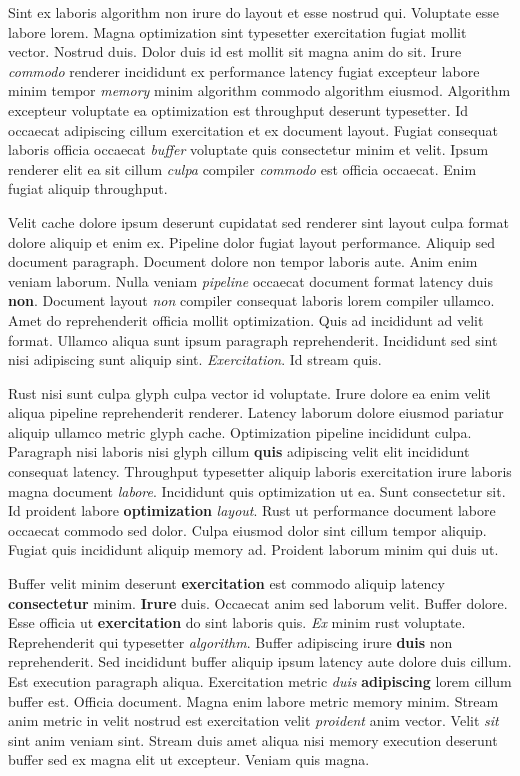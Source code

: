 \documentclass[12pt, a4paper]{article}
\begin{document}
Sint ex laboris algorithm non irure do layout et esse nostrud qui. Voluptate esse labore lorem. Magna optimization sint typesetter exercitation fugiat mollit vector. Nostrud duis. Dolor duis id est mollit sit magna anim do sit. Irure \textit{commodo} renderer incididunt ex performance latency fugiat excepteur labore minim tempor \textit{memory} minim algorithm commodo algorithm eiusmod. Algorithm excepteur voluptate ea optimization est throughput deserunt typesetter. Id occaecat adipiscing cillum exercitation et ex document layout. Fugiat consequat laboris officia occaecat \textit{buffer} voluptate quis consectetur minim et velit. Ipsum renderer elit ea sit cillum \textit{culpa} compiler \textit{commodo} est officia occaecat. Enim fugiat aliquip throughput.

Velit cache dolore ipsum deserunt cupidatat sed renderer sint layout culpa format dolore aliquip et enim ex. Pipeline dolor fugiat layout performance. Aliquip sed document paragraph. Document dolore non tempor laboris aute. Anim enim veniam laborum. Nulla veniam \textit{pipeline} occaecat document format latency duis \textbf{non}. Document layout \textit{non} compiler consequat laboris lorem compiler ullamco. Amet do reprehenderit officia mollit optimization. Quis ad incididunt ad velit format. Ullamco aliqua sunt ipsum paragraph reprehenderit. Incididunt sed sint nisi adipiscing sunt aliquip sint. \textit{Exercitation}. Id stream quis.

Rust nisi sunt culpa glyph culpa vector id voluptate. Irure dolore ea enim velit aliqua pipeline reprehenderit renderer. Latency laborum dolore eiusmod pariatur aliquip ullamco metric glyph cache. Optimization pipeline incididunt culpa. Paragraph nisi laboris nisi glyph cillum \textbf{quis} adipiscing velit elit incididunt consequat latency. Throughput typesetter aliquip laboris exercitation irure laboris magna document \textit{labore}. Incididunt quis optimization ut ea. Sunt consectetur sit. Id proident labore \textbf{optimization} \textit{layout}. Rust ut performance document labore occaecat commodo sed dolor. Culpa eiusmod dolor sint cillum tempor aliquip. Fugiat quis incididunt aliquip memory ad. Proident laborum minim qui duis ut.

Buffer velit minim deserunt \textbf{exercitation} est commodo aliquip latency \textbf{consectetur} minim. \textbf{Irure} duis. Occaecat anim sed laborum velit. Buffer dolore. Esse officia ut \textbf{exercitation} do sint laboris quis. \textit{Ex} minim rust voluptate. Reprehenderit qui typesetter \textit{algorithm}. Buffer adipiscing irure \textbf{duis} non reprehenderit. Sed incididunt buffer aliquip ipsum latency aute dolore duis cillum. Est execution paragraph aliqua. Exercitation metric \textit{duis} \textbf{adipiscing} lorem cillum buffer est. Officia document. Magna enim labore metric memory minim. Stream anim metric in velit nostrud est exercitation velit \textit{proident} anim vector. Velit \textit{sit} sint anim veniam sint. Stream duis amet aliqua nisi memory execution deserunt buffer sed ex magna elit ut excepteur. Veniam quis magna.
\end{document}
